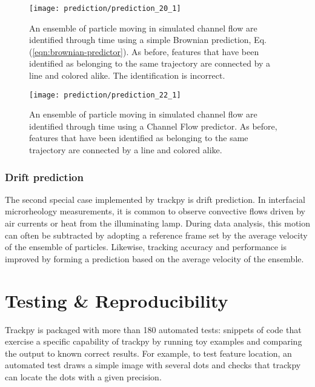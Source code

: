    \begin{figure}
    \centering
    \texttt{[image: prediction/prediction\_20\_1]}
    \caption[An ensemble of particle moving in simulated channel flow are identified through time using a simple Brownian prediction.]{\label{fig:prediction-channel-brownian-link}An ensemble of particle moving in simulated channel flow are identified through time using a simple Brownian prediction, Eq. (\ref{eqn:brownian-predictor}). As before, features that have been identified as belonging to the same trajectory are connected by a line and colored alike. The identification is incorrect.}
    \end{figure}

   \begin{figure}
    \centering
    \texttt{[image: prediction/prediction\_22\_1]}
    \caption[An ensemble of particle moving in simulated channel flow are identified through time using a Channel Flow predictor.]{\label{fig:prediction-channel-channel-link}An ensemble of particle moving in simulated channel flow are identified through time using a Channel Flow predictor. As before, features that have been identified as belonging to the same trajectory are connected by a line and colored alike. }
    \end{figure}

    \subsubsection{Drift prediction}\label{drift-prediction}
    
The second special case implemented by trackpy is drift prediction. In interfacial microrheology measurements, it is common to observe convective flows driven by air currents or heat from the illuminating lamp. During data analysis, this motion can often be subtracted by adopting a reference frame set by the average velocity of the ensemble of particles. Likewise, tracking accuracy and performance is improved by forming a prediction based on the average velocity of the ensemble.

\section{\label{sec:testing}Testing \& Reproducibility}

Trackpy is packaged with more than 180 automated tests: snippets of code that exercise a specific capability of trackpy by running toy examples and comparing the output to known correct results. For example, to test feature location, an automated test draws a simple image with several dots and checks that trackpy can locate the dots with a given precision.

